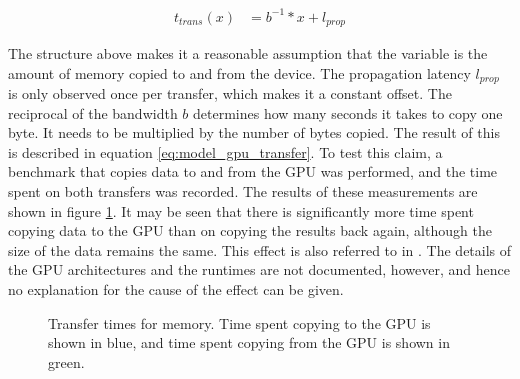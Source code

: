 \begin{align}
	\label{eq:model_gpu_transfer}
	t_{trans}(x) &= b^{-1} * x + l_{prop}
\end{align}

The structure above makes it a reasonable assumption that the variable is the amount of memory  copied to and from the device. The propagation latency $l_{prop}$ is only observed once per transfer, which makes it a constant offset. The reciprocal of the bandwidth $b$ determines how many seconds it takes to copy one byte. It needs to be multiplied by the number of bytes copied. The result of this is described in equation \ref{eq:model_gpu_transfer}. To test this claim, a benchmark that copies data to and from the GPU was performed, and the time spent on both transfers was recorded. The results of these measurements are shown in figure \ref{fig:model_gpu_transfer}. It may be seen that there is significantly more time spent copying data to the GPU than on copying the results back again, although the size of the data remains the same. This effect is also  referred to in \cite{fujii2013data}. The details of the GPU architectures and the runtimes are not documented, however, and hence no explanation for the cause of the effect can be given. \\

\begin{figure}
	\begin{center}
		\caption{Transfer times for memory. Time spent copying to the GPU is shown in blue, and time spent copying from the GPU is shown in green.}
		\label{fig:model_gpu_transfer}
	\end{center}
\end{figure}

